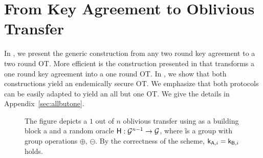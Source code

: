 \section{From Key Agreement to Oblivious Transfer}\label{sec:endemicOT}

In , we present the generic construction from any two round key agreement to a two round OT. More efficient is the construction presented in  that transforms a one round key agreement into a one round OT. In , we show that both constructions yield an endemically secure OT. We emphasize that both protocols can be easily adapted to yield an all but one OT. We give the details in Appendix~\ref{sec:allbutone}.



\begin{figure}
\centering
{}
\caption{The figure depicts a $1$ out of $n$ oblivious transfer using as a building block a \UKA and a random oracle $\mathsf{H}:\mathcal{G}^{n-1}\rightarrow\mathcal{G}$, where \G is a group with group operations $\oplus$, $\ominus$. By the correctness of the \UKA scheme, $\mathsf{k}_{\mathsf{A},i}=\mathsf{k}_{\mathsf{B},i}$ holds.}
\label{fig:KAtoOT}
\end{figure}

